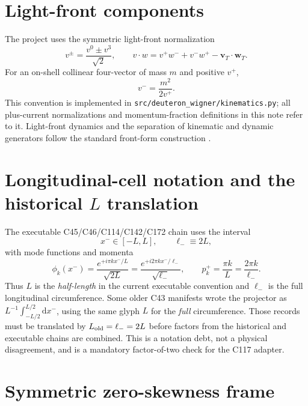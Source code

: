 \documentclass[11pt,oneside]{book}
\newcommand{\dd}{\mathrm{d}}
\newcommand{\codepath}[1]{\nolinkurl{#1}}
\begin{document}
\section{Light-front components}

The project uses the symmetric light-front normalization
\begin{equation}
 v^{\pm}=\frac{v^0\pm v^3}{\sqrt{2}},
 \qquad
 v\cdot w=v^+w^-+v^-w^+-\bm v_T\cdot\bm w_T.
 \label{eq:lf-components}
\end{equation}
For an on-shell collinear four-vector of mass $m$ and positive $v^+$,
\begin{equation}
 v^- = \frac{m^2}{2v^+}.
 \label{eq:on-shell-minus}
\end{equation}
This convention is implemented in \codepath{src/deuteron_wigner/kinematics.py}; all plus-current normalizations and momentum-fraction definitions in this note refer to it.  Light-front dynamics and the separation of kinematic and dynamic generators follow the standard front-form construction \cite{Dirac1949,BrodskyPauliPinsky1998,Carbonell1998,Miller2000LF}.

\section{Longitudinal-cell notation and the historical \texorpdfstring{$L$}{L} translation}
\label{sec:cell-notation}

The executable C45/C46/C114/C142/C172 chain uses the interval
\begin{equation}
 x^-\in[-L,L],\qquad \ell_-\equiv 2L,
 \label{eq:cell-circumference}
\end{equation}
with mode functions and momenta
\begin{equation}
 \phi_k(x^-)=\frac{e^{+i\pi kx^-/L}}{\sqrt{2L}}
 =\frac{e^{+i2\pi kx^-/\ell_-}}{\sqrt{\ell_-}},
 \qquad p_k^+=\frac{\pi k}{L}=\frac{2\pi k}{\ell_-}.
 \label{eq:cell-modes}
\end{equation}
Thus $L$ is the \emph{half-length} in the current executable convention and $\ell_-$ is the full longitudinal circumference.  Some older C43 manifests wrote the projector as $L^{-1}\int_{-L/2}^{L/2}\dd x^-$, using the same glyph $L$ for the \emph{full} circumference.  Those records must be translated by $L_{\rm old}=\ell_-=2L$ before factors from the historical and executable chains are combined.  This is a notation debt, not a physical disagreement, and is a mandatory factor-of-two check for the C117 adapter.

\section{Symmetric zero-skewness frame}
\end{document}
